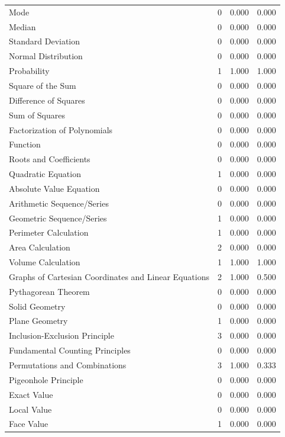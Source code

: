 \begin{longtable}{@{}p{.60\linewidth}rrr@{}}
Mode & 0 & 0.000 & 0.000\\
Median & 0 & 0.000 & 0.000\\
Standard Deviation & 0 & 0.000 & 0.000\\
Normal Distribution & 0 & 0.000 & 0.000\\
Probability & 1 & 1.000 & 1.000\\
Square of the Sum & 0 & 0.000 & 0.000\\
Difference of Squares & 0 & 0.000 & 0.000\\
Sum of Squares & 0 & 0.000 & 0.000\\
Factorization of Polynomials & 0 & 0.000 & 0.000\\
Function & 0 & 0.000 & 0.000\\
Roots and Coefficients & 0 & 0.000 & 0.000\\
Quadratic Equation & 1 & 0.000 & 0.000\\
Absolute Value Equation & 0 & 0.000 & 0.000\\
Arithmetic Sequence/Series & 0 & 0.000 & 0.000\\
Geometric Sequence/Series & 1 & 0.000 & 0.000\\
Perimeter Calculation & 1 & 0.000 & 0.000\\
Area Calculation & 2 & 0.000 & 0.000\\
Volume Calculation & 1 & 1.000 & 1.000\\
Graphs of Cartesian Coordinates and Linear Equations & 2 & 1.000 & 0.500\\
Pythagorean Theorem & 0 & 0.000 & 0.000\\
Solid Geometry & 0 & 0.000 & 0.000\\
Plane Geometry & 1 & 0.000 & 0.000\\
Inclusion-Exclusion Principle & 3 & 0.000 & 0.000\\
Fundamental Counting Principles & 0 & 0.000 & 0.000\\
Permutations and Combinations & 3 & 1.000 & 0.333\\
Pigeonhole Principle & 0 & 0.000 & 0.000\\
Exact Value & 0 & 0.000 & 0.000\\
Local Value & 0 & 0.000 & 0.000\\
Face Value & 1 & 0.000 & 0.000\\
\bottomrule\end{longtable}\normalsize

